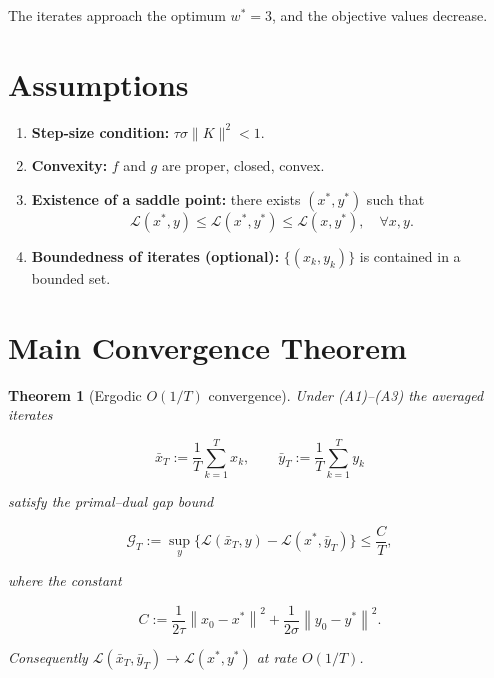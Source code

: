 \documentclass{article}
\newtheorem{theorem}{Theorem}
\newcommand{\norm}[1]{\left\|#1\right\|}
\begin{document}
The iterates approach the optimum $w^{*}=3$, and the objective values decrease.

\section*{Assumptions}
\begin{enumerate}
  \item[(A1)] \textbf{Step‑size condition:} $\tau\sigma\|K\|^{2}<1$.
  \item[(A2)] \textbf{Convexity:} $f$ and $g$ are proper, closed, convex.
  \item[(A3)] \textbf{Existence of a saddle point:} there exists $(x^{*},y^{*})$ such that  
        \[
        \mathcal{L}(x^{*},y)\le \mathcal{L}(x^{*},y^{*})\le \mathcal{L}(x,y^{*}),
        \quad\forall x,y.
        \]
  \item[(A4)] \textbf{Boundedness of iterates (optional):} $\{(x_{k},y_{k})\}$ is contained in a bounded set.
\end{enumerate}

\section*{Main Convergence Theorem}
\begin{theorem}[Ergodic $O(1/T)$ convergence]\label{thm:main}
Under (A1)–(A3) the averaged iterates  

\[
\bar{x}_{T}:=\frac{1}{T}\sum_{k=1}^{T}x_{k},\qquad 
\bar{y}_{T}:=\frac{1}{T}\sum_{k=1}^{T}y_{k}
\]

satisfy the primal–dual gap bound  

\[
\boxed{
\mathcal{G}_{T}:=
\sup_{y}\bigl\{\mathcal{L}(\bar{x}_{T},y)-\mathcal{L}(x^{*},\bar{y}_{T})\bigr\}
\le
\frac{C}{T},
}
\tag{2}
\]

where the constant  

\[
C:=\frac{1}{2\tau}\norm{x_{0}-x^{*}}^{2}
   +\frac{1}{2\sigma}\norm{y_{0}-y^{*}}^{2}.
\tag{3}
\]

Consequently $\mathcal{L}(\bar{x}_{T},\bar{y}_{T})\to \mathcal{L}(x^{*},y^{*})$ at rate $O(1/T)$.
\end{theorem}

\end{document}
